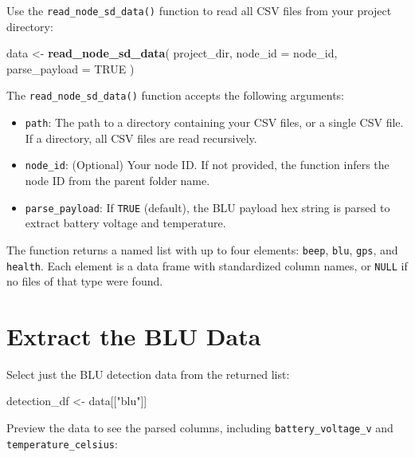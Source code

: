 \documentclass[
]{book}
\newenvironment{Shaded}{\begin{snugshade}}{\end{snugshade}}
\newcommand{\AttributeTok}[1]{\textcolor[rgb]{0.13,0.29,0.53}{#1}}
\newcommand{\ConstantTok}[1]{\textcolor[rgb]{0.56,0.35,0.01}{#1}}
\newcommand{\FunctionTok}[1]{\textcolor[rgb]{0.13,0.29,0.53}{\textbf{#1}}}
\newcommand{\NormalTok}[1]{#1}
\newcommand{\OtherTok}[1]{\textcolor[rgb]{0.56,0.35,0.01}{#1}}
\newcommand{\StringTok}[1]{\textcolor[rgb]{0.31,0.60,0.02}{#1}}
\providecommand{\tightlist}{%
  \setlength{\itemsep}{0pt}\setlength{\parskip}{0pt}}
\begin{document}
Use the \texttt{read\_node\_sd\_data()} function to read all CSV files from your project directory:

\begin{Shaded}
\begin{Highlighting}[]
\NormalTok{data }\OtherTok{\textless{}{-}} \FunctionTok{read\_node\_sd\_data}\NormalTok{(}
\NormalTok{  project\_dir,}
  \AttributeTok{node\_id =}\NormalTok{ node\_id,}
  \AttributeTok{parse\_payload =} \ConstantTok{TRUE}
\NormalTok{)}
\end{Highlighting}
\end{Shaded}

The \texttt{read\_node\_sd\_data()} function accepts the following arguments:

\begin{itemize}
\tightlist
\item
  \texttt{path}: The path to a directory containing your CSV files, or a single CSV file. If a directory, all CSV files are read recursively.
\item
  \texttt{node\_id}: (Optional) Your node ID. If not provided, the function infers the node ID from the parent folder name.
\item
  \texttt{parse\_payload}: If \texttt{TRUE} (default), the BLU payload hex string is parsed to extract battery voltage and temperature.
\end{itemize}

The function returns a named list with up to four elements: \texttt{beep}, \texttt{blu}, \texttt{gps}, and \texttt{health}. Each element is a data frame with standardized column names, or \texttt{NULL} if no files of that type were found.

\section{Extract the BLU Data}\label{extract-the-blu-data}

Select just the BLU detection data from the returned list:

\begin{Shaded}
\begin{Highlighting}[]
\NormalTok{detection\_df }\OtherTok{\textless{}{-}}\NormalTok{ data[[}\StringTok{"blu"}\NormalTok{]]}
\end{Highlighting}
\end{Shaded}

Preview the data to see the parsed columns, including \texttt{battery\_voltage\_v} and \texttt{temperature\_celsius}:
\end{document}
